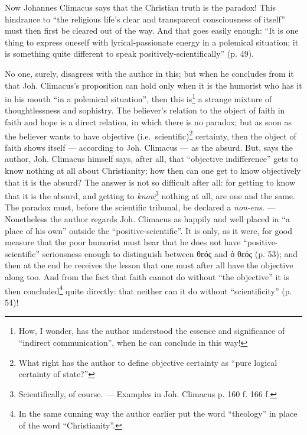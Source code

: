 \documentclass[12pt,a4paper]{book}
\newcommand{\opage}[1]{\marginnote{\footnotesize\textit{[#1]}}}
\begin{document}
Now Johannes Climacus says that the Christian truth
is the paradox! This hindrance to ``the religious life's
clear and transparent consciousness of itself'' must then first
be cleared out of the way. And that goes easily enough: ``It is one thing to express oneself with
lyrical-passionate energy in a polemical situation;
it is something quite different to speak positively-scientifically'' (p. 49).

No one, surely, disagrees with the author in this; but when he
concludes from it that Joh. Climacus's proposition can hold only
when it is the humorist who has it in his mouth ``in a polemical
situation'', then this is\footnote{How, I wonder, has the author understood the essence and significance of ``indirect communication'', when he can conclude in this way!} a strange mixture of thoughtlessness
and sophistry. The believer's relation to the object of faith
in faith and hope is a direct relation, in which there
is no paradox; but as soon as the believer wants to have objective
(i.e.\ scientific)\footnote{What right has the author to define objective certainty as ``pure logical certainty of state?''} certainty, then the object of faith shows itself
--- according to Joh. Climacus --- as the absurd. But, says
the author, Joh. Climacus himself says, after all, that ``objective indifference''
gets to know nothing at all about Christianity; how
then can one get to know objectively that it is the absurd?
The answer is not so difficult after all: for getting to
know that it is the absurd, and getting to \emph{know}\footnote{Scientifically, of course. --- Examples in Joh. Climacus p. 160 f. 166 f.} nothing at all, are one and the same. The paradox must, before
the scientific tribunal, be declared a \textit{non-ens}. --- Nonetheless
the author regards Joh. Climacus as happily and well
placed in ``a place of his own'' outside the ``positive-scientific''.
It is only, as it were, for good measure that the poor
\opage{10}\setcounter{footnote}{0}%
humorist must hear that he does not have ``positive-scientific''
seriousness enough to distinguish between θεός and ὁ θεός (p. 53); and
then at the end he receives the lesson that one must after all
have the objective along too. And from the fact that faith cannot
do without ``the objective'' it is then concluded\footnote{In the same cunning way the author earlier put the word ``theology'' in place of the word ``Christianity''.} quite directly: that neither
can it do without ``scientificity'' (p. 54)!
\end{document}
